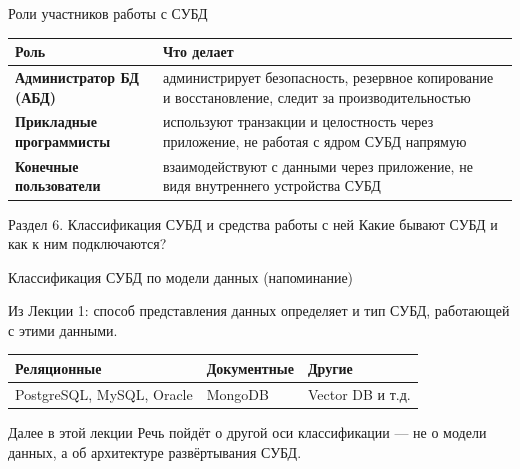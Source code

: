 \documentclass[aspectratio=169]{beamer}
\begin{document}
\begin{frame}{Роли участников работы с СУБД}

\small
\begin{table}
\centering
\begin{tabular}{>{\bfseries}p{}|p{}}
\toprule
Роль & Что делает\\
\midrule
Администратор БД (АБД) &
администрирует безопасность, резервное копирование
и восстановление, следит за производительностью\\
Прикладные программисты &
используют транзакции и целостность через приложение,
не работая с ядром СУБД напрямую\\
Конечные пользователи &
взаимодействуют с данными через приложение,
не видя внутреннего устройства СУБД\\
\bottomrule
\end{tabular}
\end{table}

\end{frame}



\begin{frame}{Раздел 6. Классификация СУБД и средства работы с ней}
\centering
\Large
Какие бывают СУБД и как к ним подключаются?
\end{frame}


\begin{frame}{Классификация СУБД по модели данных (напоминание)}

Из Лекции 1: способ представления данных определяет
и тип СУБД, работающей с этими данными.

\vspace{0.4cm}

\begin{table}
\centering
\small
\begin{tabular}{p{}|p{}|p{}}
\toprule
Реляционные & Документные & Другие\\
\midrule
PostgreSQL, MySQL, Oracle & MongoDB & Vector DB и т.д.\\
\bottomrule
\end{tabular}
\end{table}

\vspace{0.4cm}

\begin{alertblock}{Далее в этой лекции}
Речь пойдёт о другой оси классификации — не о модели
данных, а об архитектуре развёртывания СУБД.
\end{alertblock}

\end{frame}
\end{document}
